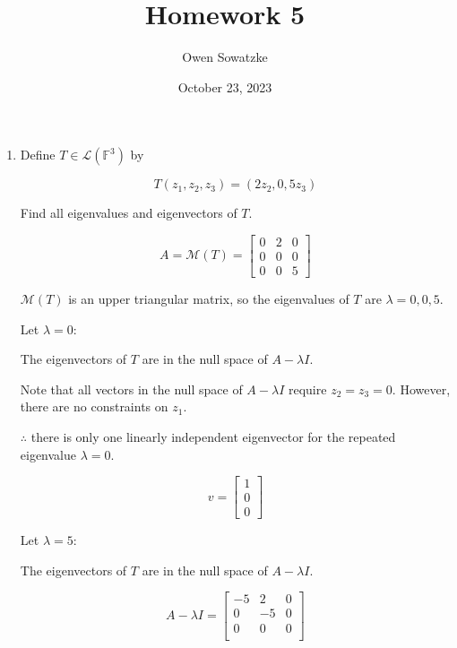 \documentclass[fleqn]{article}
\title{Homework 5}
\author{Owen Sowatzke}
\date{October 23, 2023}
\makeatletter
\newcommand{\zerodisplayskip}{
	\setlength{\abovedisplayskip}{0pt}%
	\setlength{\belowdisplayskip}{0pt}%
	\setlength{\abovedisplayshortskip}{0pt}%
	\setlength{\belowdisplayshortskip}{0pt}%
	\setlength{\mathindent}{0pt}}
\newenvironment{equationCenter}{\@fleqnfalse\begin{equation*}}{\end{equation*}}
\makeatother
\begin{document}
	\offinterlineskip
	\setlength{\lineskip}{12pt}
	\zerodisplayskip
	\maketitle
	
	\begin{enumerate}[nolistsep]
		\item Define $T \in \mathcal{L}(\mathbb{F}^3)$ by
		
		\begin{equationCenter}
			T(z_1, z_2, z_3) = (2z_2, 0, 5z_3)
		\end{equationCenter}
		
		Find all eigenvalues and eigenvectors of $T$.
		
		\begin{equation*}
			A = \mathcal{M}(T) = \begin{bmatrix}
				0 & 2 & 0 \\
				0 & 0 & 0 \\
				0 & 0 & 5
			\end{bmatrix}
		\end{equation*}
		
		$\mathcal{M}(T)$ is an upper triangular matrix, so the eigenvalues of $T$ are $\lambda = 0, 0, 5$.
		
		Let $\lambda = 0$:
		
		The eigenvectors of $T$ are in the null space of $A - {\lambda}I$.
		
		Note that all vectors in the null space of $A - {\lambda}I$ require $z_2 = z_3 = 0$. However, there are no constraints on $z_1$.
		
		$\therefore$ there is only one linearly independent eigenvector for the repeated eigenvalue $\lambda=0$.
		
		\begin{equation*}
			v = \begin{bmatrix}
				1 \\
				0 \\
				0
			\end{bmatrix}
		\end{equation*}
		
		Let $\lambda = 5$:
		
		The eigenvectors of $T$ are in the null space of $A - {\lambda}I$.
		
		\begin{equation*}
			A - {\lambda}I = \begin{bmatrix}
				-5 &  2 & 0 \\
				 0 & -5 & 0 \\
				 0 &  0 & 0 \\
			\end{bmatrix}
		\end{equation*}
		

\end{enumerate}
\end{document}
